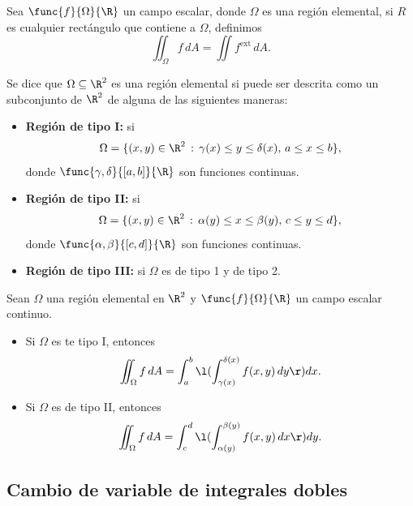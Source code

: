 \documentclass[a4,11pt]{aleph-notas}
\begin{document}
\begin{defi}
    Sea $\func{f}{\Omega}{\R}$ un campo escalar, donde $\Omega$ es una región elemental, si $R$ es cualquier rectángulo que contiene a $\Omega$, definimos
    \[
        \iint_\Omega f\, dA = \iint f^{\text{ext}}\, dA.
    \]
\end{defi}

\begin{defi}
    Se dice que $\Omega\subseteq\R^2$ es una región elemental si puede ser descrita como un subconjunto de $\R^2$ de alguna de las siguientes maneras:
    \begin{itemize}
        \item \textbf{Región de tipo I:} si
        \[
            \Omega=\{(x,y)\in\R^2 \, : \, \gamma(x) \leq y \leq \delta(x), \, a\leq x\leq b \},
        \]
        donde $\func{\gamma, \delta}{[a,b]}{\R}$ son funciones continuas.
        \item \textbf{Región de tipo II:} si
        \[
            \Omega=\{(x,y)\in\R^2 \, : \, \alpha(y) \leq x \leq \beta(y), \, c\leq y\leq d \},
        \]
        donde $\func{\alpha, \beta}{[c,d]}{\R}$ son funciones continuas.
        \item \textbf{Región de tipo III:} si $\Omega$ es de tipo 1 y de tipo 2.
    \end{itemize}
\end{defi}

\begin{teo}
    Sean $\Omega$ una región elemental en $\R^2$ y $\func{f}{\Omega}{\R}$ un campo escalar continuo.
    \begin{itemize}
        \item Si $\Omega$ es te tipo I, entonces
        \[
            \iint_\Omega f\, dA = \int_a^b\l( \int_{\gamma(x)}^{\delta(x)}f(x,y) \, dy\r)dx.
        \]
        \item Si $\Omega$ es de tipo II, entonces
        \[
            \iint_\Omega f\, dA = \int_c^d\l( \int_{\alpha(y)}^{\beta(y)}f(x,y) \, dx\r)dy.
        \]
    \end{itemize}
\end{teo}

\subsection{Cambio de variable de integrales dobles}
\end{document}
